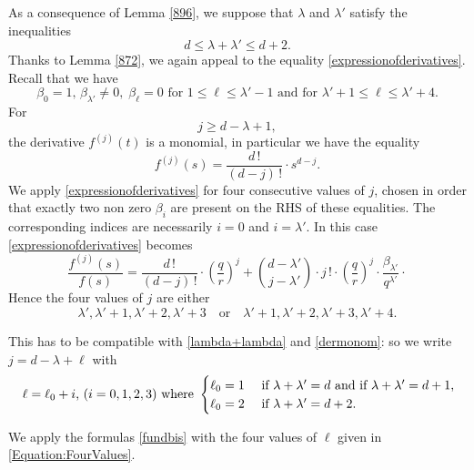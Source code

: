 \documentclass[10pt]{article}
\theoremstyle{definition}
\numberwithin{equation}{section}
\begin{document}
As a consequence of Lemma \ref{896}, we suppose that $\lambda$ and $\lambda'$ satisfy the inequalities
\begin{equation}\label{lambda+lambda}
d\leqslant \lambda + \lambda ' \leqslant d+2.
\end{equation}
 Thanks to Lemma \ref{872}, we again appeal to the equality \eqref{expressionofderivatives}. Recall that we have 
\[
\beta_0 =1,\, \beta_{\lambda'}\not=0, \; \beta_\ell=0 \text{ for } 1\leqslant \ell \leqslant \lambda' -1 \text{ and for }\lambda' +1\leqslant \ell \leqslant \lambda' +4.
\]
For 
\begin{equation}\label{dermonom}j\geqslant d-\lambda +1,
\end{equation} the derivative $f^{(j)} (t)$ is a monomial,
in particular we have the equality 
\begin{equation}\label{explicitderivative}
f^{(j)} (s) = \frac{d\, !}{(d-j)\, !}\cdot s^{d-j}.
\end{equation} 
We apply \eqref{expressionofderivatives} for four consecutive values of $j$, chosen in order that exactly two non zero $\beta_i$ are present on the RHS of these equalities. 
The corresponding indices are necessarily $i= 0$ and $i = \lambda'$. In this case \eqref{expressionofderivatives} becomes 
 \begin{equation}\label{fundbis}
 \frac{f^{(j)}(s)}{f(s)} =\frac{d\, !}{(d-j)\, !}\cdot \left( \frac {q}r\right)^j +\binom{d-\lambda'}{j-\lambda'} \cdot j\, ! \cdot 
\left( \frac qr\right)^j \cdot \frac{\beta_{\lambda'}}{q^{\lambda'}}\cdotp
\end{equation}
Hence the four values of $j$ are either 
\[
\lambda', \lambda' +1,\lambda' +2,\lambda' +3 \quad\text{or}\quad \lambda' +1,\lambda' +2,\lambda' +3, \lambda' + 4.
\]
 
This has to be compatible with \eqref{lambda+lambda} and \eqref{dermonom}: so we write
$j=d-\lambda+\ell$ with 
\begin{equation}\label{Equation:FourValues}
\text{ $\ell= \ell_0+i$, $(i=0,1,2,3)$ where } 
 \begin{cases}
 \displaystyle{
\ell_0 = 1 } & \hbox{ if $\lambda + \lambda' =d$ and if $\lambda + \lambda' =d+1$,}
 \\
 \displaystyle{
\ell_0 = 2}& \hbox{ if $\lambda + \lambda' =d+2$.}
\end{cases}
 \end{equation}
 
 We apply the formulas \eqref{fundbis}
with the four values of $\ell$ given in \eqref{Equation:FourValues}. 
\end{document}
